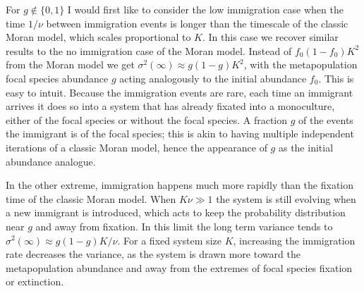 For $g\notin \{0,1\}$ I would first like to consider the low immigration case when the time $1/\nu$ between immigration events is longer than the timescale of the classic Moran model, which scales proportional to $K$. 
In this case we recover similar results to the no immigration case of the Moran model. 
Instead of $f_0(1-f_0)K^2$ from the Moran model we get $\sigma^2(\infty) \approx g(1-g) K^2$, with the metapopulation focal species abundance $g$ acting analogously to the initial abundance $f_0$. 
This is easy to intuit. Because the immigration events are rare, each time an immigrant arrives it does so into a system that has already fixated into a monoculture, either of the focal species or without the focal species. 
A fraction $g$ of the events the immigrant is of the focal species; this is akin to having multiple independent iterations of a classic Moran model, hence the appearance of $g$ as the initial abundance analogue. %

In the other extreme, immigration happens much more rapidly than the fixation time of the classic Moran model. 
When $K\nu\gg 1$ the system is still evolving when a new immigrant is introduced, which acts to keep the probability distribution near $g$ and away from fixation. 
In this limit the long term variance tends to $\sigma^2(\infty) \approx g(1-g) K/\nu$. 
For a fixed system size $K$, increasing the immigration rate decreases the variance, as the system is drawn more toward the metapopulation abundance and away from the extremes of focal species fixation or extinction. 

